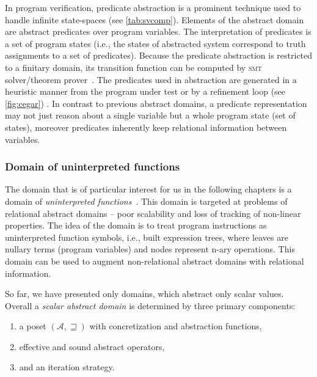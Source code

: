 In program verification, predicate abstraction \cite{Graf1997, Bjorner1997} is
a prominent technique used to handle infinite state-spaces (see
\autoref{tab:svcomp}). Elements of the abstract domain are abstract predicates
over program variables. The interpretation of predicates is a set of program
states (i.e., the states of abstracted system correspond to truth assignments
to a set of predicates). Because the predicate abstraction is restricted to a
finitary domain, its transition function can be computed by \textsc{smt} solver/theorem
prover~\cite{Cousot2003, Ball2001}. The predicates used in abstraction are
generated in a heuristic manner from the program under test or by a refinement
loop (see \autoref{fig:cegar}) \cite{Flanagan2002}. In contrast to previous
abstract domains, a predicate representation may not just reason about a single
variable but a whole program state (set of states), moreover predicates
inherently keep relational information between variables.

\subsubsection{Domain of uninterpreted functions}

The domain that is of particular interest for us in the following chapters is a
domain of \emph{uninterpreted functions}~\cite{Gange2016}. This domain is targeted
at problems of relational abstract domains -- poor scalability and loss of
tracking of non-linear properties. The idea of the domain is to treat program
instructions as uninterpreted function symbols, i.e., built expression trees,
where leaves are nullary terms (program variables) and nodes represent n-ary
operations. This domain can be used to augment non-relational abstract domains
with relational information.

\bigskip
\prule
\bigskip

So far, we have presented only domains, which abstract only scalar values.
Overall a \emph{scalar abstract domain} is determined by three primary
components:

\label{sec:ingredients}
\begin{enumerate}
    \itemsep0em
    \item a poset $(\mathcal{A}, \sqsupseteq)$ with concretization and abstraction functions,
    \item effective and sound abstract operators,
    \item and an iteration strategy.
\end{enumerate}


